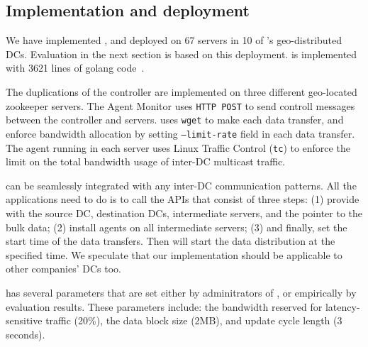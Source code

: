 \subsection{Implementation and deployment}
\label{sec:deployment}

We have implemented \name, and deployed on 67 servers in 10 of
\company's geo-distributed DCs. Evaluation in the next section is
based on this deployment. \name is implemented with 3621 lines of
golang code~\cite{golang}.

The duplications of the controller are implemented on three different
geo-located zookeeper servers. The Agent Monitor uses \texttt{HTTP
POST} to send controll messages between the controller and servers.
\name uses \texttt{wget} to make each data transfer, and enforce
bandwidth allocation by setting \texttt{--limit-rate} field in each
data transfer. The agent running in each server uses Linux Traffic
Control (\texttt{tc}) to enforce the limit on the total bandwidth
usage of inter-DC multicast traffic.

\name can be seamlessly integrated with any inter-DC communication
patterns. All the applications need to do is to call the \name APIs
that consist of three steps: (1) provide \name with the source DC,
destination DCs, intermediate servers, and the pointer to the bulk
data; (2) install agents on all intermediate servers; (3) and
finally, set the start time of the data transfers. Then \name will
start the data distribution at the specified time. We speculate that
our implementation should be applicable to other companies' DCs too.

\name has several parameters that are set either by adminitrators of
\company, or empirically by evaluation results. These parameters
include: the bandwidth reserved for latency-sensitive traffic (20\%),
the data block size (2MB), and update cycle length (3 seconds). 

